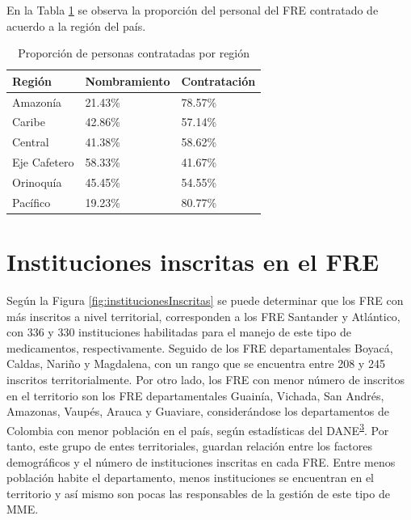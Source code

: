 \documentclass[
]{book}
\begin{document}
En la Tabla \ref{tab:CaracterizacionIngreso1} se observa la proporción del personal del FRE contratado de acuerdo a la región del país.

\begin{table}

\caption{\label{tab:CaracterizacionIngreso1}Proporción de personas contratadas por región}
\centering
\begin{tabular}[t]{lll}
\toprule
Región & Nombramiento & Contratación\\
\midrule
Amazonía & 21.43\% & 78.57\%\\
Caribe & 42.86\% & 57.14\%\\
Central & 41.38\% & 58.62\%\\
Eje Cafetero & 58.33\% & 41.67\%\\
Orinoquía & 45.45\% & 54.55\%\\
\addlinespace
Pacífico & 19.23\% & 80.77\%\\
\bottomrule
\end{tabular}
\end{table}

\hypertarget{instituciones-inscritas-en-el-fre}{%
\section{Instituciones inscritas en el FRE}\label{instituciones-inscritas-en-el-fre}}

Según la Figura \ref{fig:institucionesInscritas} se puede determinar que los FRE con más inscritos a nivel territorial, corresponden a los FRE Santander y Atlántico, con 336 y 330 instituciones habilitadas para el manejo de este tipo de medicamentos, respectivamente. Seguido de los FRE departamentales Boyacá, Caldas, Nariño y Magdalena, con un rango que se encuentra entre 208 y 245 inscritos territorialmente. Por otro lado, los FRE con menor número de inscritos en el territorio son los FRE departamentales Guainía, Vichada, San Andrés, Amazonas, Vaupés, Arauca y Guaviare, considerándose los departamentos de Colombia con menor población en el país, según estadísticas del DANE\textsuperscript{\protect\hyperlink{ref-DANE2021}{3}}. Por tanto, este grupo de entes territoriales, guardan relación entre los factores demográficos y el número de instituciones inscritas en cada FRE. Entre menos población habite el departamento, menos instituciones se encuentran en el territorio y así mismo son pocas las responsables de la gestión de este tipo de MME.
\end{document}
